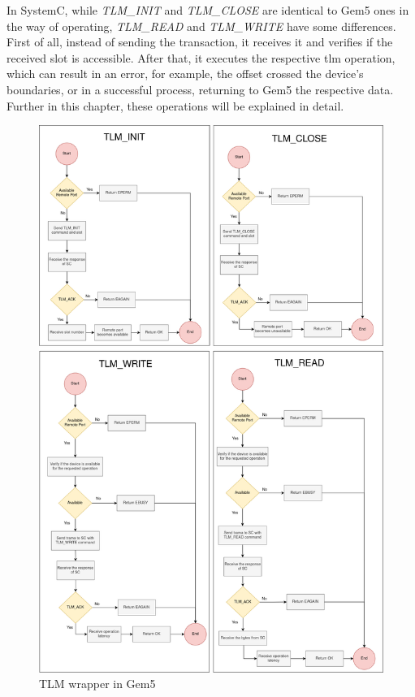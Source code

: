In SystemC, while \textit{TLM\_INIT} and \textit{TLM\_CLOSE} are identical to Gem5 ones in the way of operating, \textit{TLM\_READ} and 
\textit{TLM\_WRITE} have some differences. First of all, instead of sending the transaction, it receives it and verifies if the received slot is accessible.
After that, it executes the respective \gls{tlm} operation, which can result in an error, for example, 
the offset crossed the device's boundaries, or in a successful process, returning to Gem5 the respective data. Further in this chapter, these 
operations will be explained in detail. 


\begin{figure}[H]
	\centering
 	\includegraphics[width=0.8\linewidth]{Images/TLMWrapper_Gem5.png} 
 	\caption{TLM wrapper in Gem5}
\end{figure}

